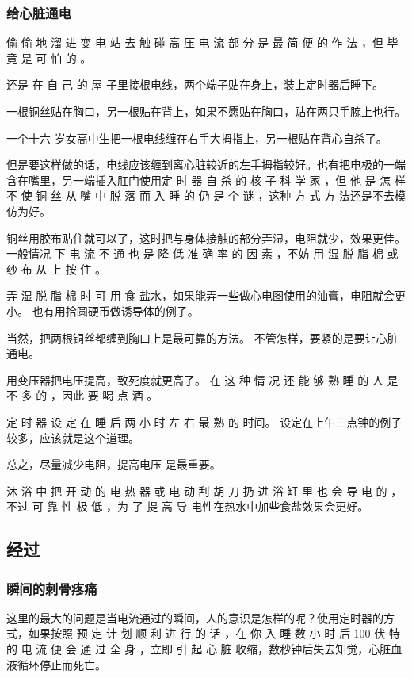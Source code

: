 \documentclass[UTF8]{ctexart}
\begin{document}
\subsubsection*{给心脏通电}

偷 偷 地 溜 进 变 电 站 去 触 碰 高 压 电 流 部 分 是 最 简 便 的 作 法 ，但 毕 竟 是 可 怕 的 。

还是 在 自 己 的 屋 子里接根电线，两个端子贴在身上，装上定时器后睡下。 

一根铜丝贴在胸口，另一根贴在背上，如果不愿贴在胸口，贴在两只手腕上也行。

一个十六 岁女高中生把一根电线缠在右手大拇指上，另一根贴在背心自杀了。

但是要这样做的话，电线应该缠到离心脏较近的左手拇指较好。也有把电极的一端含在嘴里，另一端插入肛门使用定 时 器 自 杀 的 核 子 科 学 家 ，但 他 是 怎 样 不 使 铜 丝 从 嘴 中 脱 落 而 入 睡 的 仍 是 个 谜 ，这种 方 式 方 法还是不去模仿为好。

铜丝用胶布贴住就可以了，这时把与身体接触的部分弄湿，电阻就少，效果更佳。一般情况 下 电 流 不 通 也 是 降 低 准 确 率 的 因 素 ，不妨 用 湿 脱 脂 棉 或 纱 布 从 上 按 住 。

弄 湿 脱 脂 棉 时 可 用 食 盐水，如果能弄一些做心电图使用的油膏，电阻就会更小。
也有用拾圆硬币做诱导体的例子。

当然，把两根铜丝都缠到胸口上是最可靠的方法。 
不管怎样，要紧的是要让心脏通电。

用变压器把电压提高，致死度就更高了。 
在 这 种 情 况 还 能 够 熟 睡 的 人 是 不 多 的 ，因此 要 喝 点 酒 。

定 时 器 设 定 在 睡 后 两 小 时 左 右 最 熟 的 时间。
设定在上午三点钟的例子较多，应该就是这个道理。

总之，尽量减少电阻，提高电压 是最重要。

沐 浴 中 把 开 动 的 电 热 器 或 电 动 刮 胡 刀 扔 进 浴 缸 里 也 会 导 电 的 ，不过 可 靠 性 极 低 ，为 了 提 高 导 电性在热水中加些食盐效果会更好。

\subsection{经过}

\subsubsection*{瞬间的刺骨疼痛}

这里的最大的问题是当电流通过的瞬间，人的意识是怎样的呢？使用定时器的方式，如果按照 预 定 计 划 顺 利 进 行 的 话 ，在 你 入 睡 数 小 时 后 $100$ 伏 特 的 电 流 便 会 通 过 全 身 ，立即 引 起 心 脏 收缩，数秒钟后失去知觉，心脏血液循环停止而死亡。
\end{document}
